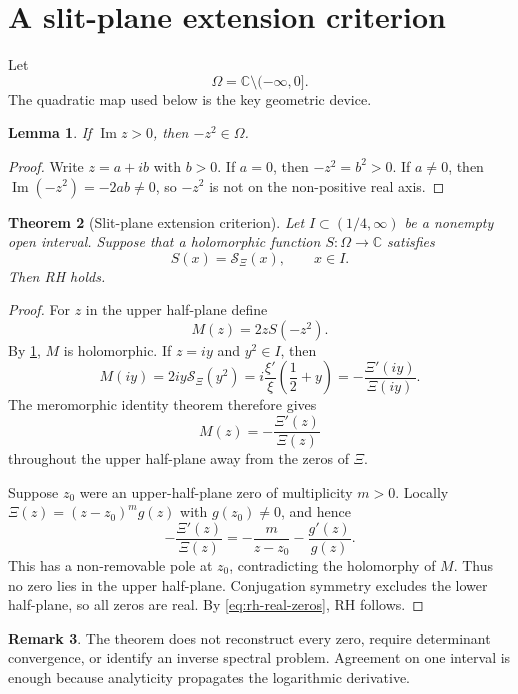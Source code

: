 \documentclass[11pt]{article}
\newtheorem{theorem}{Theorem}[section]
\newtheorem{lemma}[theorem]{Lemma}
\theoremstyle{definition}
\newtheorem{remark}[theorem]{Remark}
\newcommand{\C}{\mathbb C}
\newcommand{\XiR}{\mathcal S_{\Xi}}
\newcommand{\slit}{\C\setminus(-\infty,0]}
\begin{document}
\section{A slit-plane extension criterion}

Let
\[
 \Omega=\slit.
\]
The quadratic map used below is the key geometric device.

\begin{lemma}\label{lem:quadratic-map}
If $\operatorname{Im}z>0$, then $-z^2\in\Omega$.
\end{lemma}

\begin{proof}
Write $z=a+ib$ with $b>0$. If $a=0$, then $-z^2=b^2>0$. If $a\ne0$, then
$\operatorname{Im}(-z^2)=-2ab\ne0$, so $-z^2$ is not on the non-positive real axis.
\end{proof}

\begin{theorem}[Slit-plane extension criterion]\label{thm:slit-extension}
Let $I\subset(1/4,\infty)$ be a nonempty open interval. Suppose that a holomorphic
function $S:\Omega\to\C$ satisfies
\[
 S(x)=\XiR(x),\qquad x\in I.
\]
Then RH holds.
\end{theorem}

\begin{proof}
For $z$ in the upper half-plane define
\[
 M(z)=2zS(-z^2).
\]
By \cref{lem:quadratic-map}, $M$ is holomorphic. If $z=iy$ and $y^2\in I$, then
\[
 M(iy)=2iy\XiR(y^2)
 =i\frac{\xi'}{\xi}\left(\frac12+y\right)
 =-\frac{\Xi'(iy)}{\Xi(iy)}.
\]
The meromorphic identity theorem therefore gives
\[
 M(z)=-\frac{\Xi'(z)}{\Xi(z)}
\]
throughout the upper half-plane away from the zeros of $\Xi$.

Suppose $z_0$ were an upper-half-plane zero of multiplicity $m>0$. Locally
$\Xi(z)=(z-z_0)^m g(z)$ with $g(z_0)\ne0$, and hence
\[
 -\frac{\Xi'(z)}{\Xi(z)}=-\frac{m}{z-z_0}-\frac{g'(z)}{g(z)}.
\]
This has a non-removable pole at $z_0$, contradicting the holomorphy of $M$. Thus no
zero lies in the upper half-plane. Conjugation symmetry excludes the lower half-plane,
so all zeros are real. By \eqref{eq:rh-real-zeros}, RH follows.
\end{proof}

\begin{remark}
The theorem does not reconstruct every zero, require determinant convergence, or identify
an inverse spectral problem. Agreement on one interval is enough because analyticity
propagates the logarithmic derivative.
\end{remark}
\end{document}
